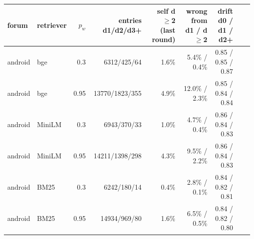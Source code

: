 \begin{tabular}{llrrrrrrr}
\toprule
forum & retriever & $p_w$ & entries d1/d2/d3+ & self d$\geq$2 (last round) & wrong from d1 / d$\geq$2 & drift d0 / d1 / d2+ \\
\midrule
android & bge & 0.3 & 6312/425/64 & 1.6\% & 5.4\% / 0.4\% & 0.85 / 0.85 / 0.87 \\
android & bge & 0.95 & 13770/1823/355 & 4.9\% & 12.0\% / 2.3\% & 0.85 / 0.84 / 0.84 \\
android & MiniLM & 0.3 & 6943/370/33 & 1.0\% & 4.7\% / 0.4\% & 0.86 / 0.84 / 0.83 \\
android & MiniLM & 0.95 & 14211/1398/298 & 4.3\% & 9.5\% / 2.2\% & 0.86 / 0.84 / 0.83 \\
android & BM25 & 0.3 & 6242/180/14 & 0.4\% & 2.8\% / 0.1\% & 0.84 / 0.82 / 0.81 \\
android & BM25 & 0.95 & 14934/969/80 & 1.6\% & 6.5\% / 0.5\% & 0.84 / 0.82 / 0.80 \\
\bottomrule
\end{tabular}
